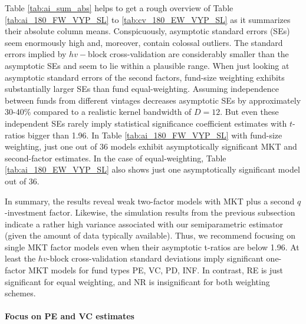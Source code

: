 \documentclass[12pt]{article}
\begin{document}
Table \ref{tab:ai_sum_abs} helps to get a rough overview of Table \ref{tab:ai_180_FW_VYP_SL} to \ref{tab:cv_180_EW_VYP_SL} as it summarizes their absolute column means.
Conspicuously, asymptotic standard errors (SEs) seem enormously high and, moreover, contain colossal outliers.
The standard errors implied by $hv-$block cross-validation are considerably smaller than the asymptotic SEs and seem to lie within a plausible range.
When just looking at asymptotic standard errors of the second factors, fund-size weighting exhibits substantially larger SEs than fund equal-weighting.
Assuming independence between funds from different vintages decreases asymptotic SEs by approximately 30-40\% compared to a realistic kernel bandwidth of $D=12$.
But even these independent SEs rarely imply statistical significance coefficient estimates with $t$-ratios bigger than 1.96.
In Table \ref{tab:ai_180_FW_VYP_SL} with fund-size weighting, just one out of 36 models exhibit asymptotically significant MKT and second-factor estimates.
In the case of equal-weighting, Table \ref{tab:ai_180_EW_VYP_SL} also shows just one asymptotically significant model out of 36.

In summary, the results reveal weak two-factor models with MKT plus a second $q$-investment factor. 
Likewise, the simulation results from the previous subsection indicate a rather high variance associated with our semiparametric estimator (given the amount of data typically available).
Thus, we recommend focusing on single MKT factor models even when their asymptotic t-ratios are below 1.96.
At least the $hv$-block cross-validation standard deviations imply significant one-factor MKT models for fund types PE, VC, PD, INF.
In contrast, RE is just significant for equal weighting, and NR is insignificant for both weighting schemes.

\paragraph{Focus on PE and VC estimates}
\end{document}
